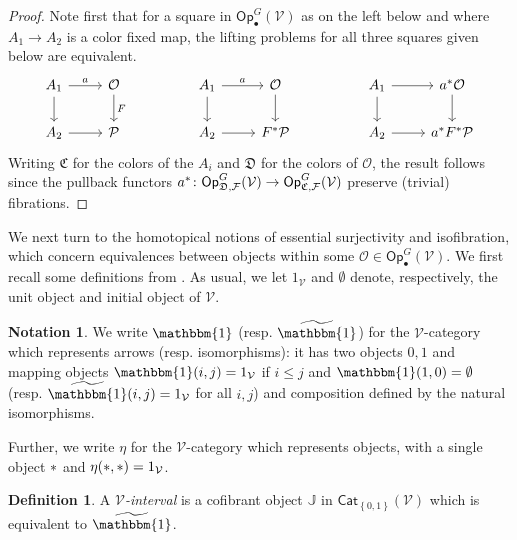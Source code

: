 \documentclass[a4paper,10pt
,draft
]{article}%
\numberwithin{equation}{section}
\numberwithin{figure}{section}
\theoremstyle{definition} %
\newtheorem{definition}[equation]{Definition}%
\newtheorem{notation}[equation]{Notation}%
\newcommand{\set}[1]{\left\{#1\right\}}%
\newcommand{\Cat}{\mathsf{Cat}}
\newcommand{\F}{\ensuremath{\mathcal F}}
\newcommand{\V}{\ensuremath{\mathcal V}}
\renewcommand{\O}{\ensuremath{\mathcal O}}
\renewcommand{\P}{\ensuremath{\mathcal P}}
\newcommand{\1}{\ensuremath{\mathbbm 1}}%
\begin{document}
\begin{proof}
Note first that for a square in $\mathsf{Op}^G_{\bullet}(\V)$
as on the left below
and where $A_1 \to A_2$ is a color fixed map, 
the lifting problems for all three squares given below are equivalent.
\begin{equation}%
\begin{tikzcd}
A_1 \arrow[d] \arrow[r, "a"]
&
\mathcal{O} \arrow[d, "F"]
&&
A_1 \arrow[d] \arrow[r, "a"]
&
\mathcal{O} \arrow[d]
&&
A_1 \arrow[d] \arrow[r]
&
a^{\**} \mathcal{O} \arrow[d]
\\
A_2 \arrow[r]
&
\P
&&
A_2 \arrow[r]
&
F^{\**} \P
&&
A_2 \arrow[r]
&
a^{\**} F^{\**} \P
\end{tikzcd}
\end{equation}
Writing $\mathfrak{C}$ for the colors of the $A_i$ and
$\mathfrak{D}$ for the colors of $\O$,
the result follows since the pullback functors
$a^{\**} \colon \mathsf{Op}^G_{\mathfrak{D},\F}(\V)
\to \mathsf{Op}^G_{\mathfrak{C},\F}(\V)$
preserve (trivial) fibrations.
\end{proof}




We next turn to the homotopical notions of essential surjectivity and isofibration, 
which concern equivalences between objects within some 
$\O \in \mathsf{Op}^G_\bullet(\V)$.
We first recall some definitions from \cite{BM13}.
As usual, we let $1_\V$ and $\emptyset$ denote, respectively, the unit object and initial object of $\V$.

\begin{notation}
      \label{1_NOT}
      We write $\mathbbm{1}$ (resp. $\widetilde{\mathbbm{1}}$)
      for the $\V$-category which represents arrows (resp. isomorphisms):
      it has two objects $0,1$
      and mapping objects
      $\mathbbm{1}(i,j)= 1_{\V}$
      if $i \leq j$
      and 
      $\mathbbm{1}(1,0)= \emptyset$
      (resp. $\widetilde{\mathbbm{1}}(i,j)= 1_{\V}$ for all $i,j$)
      and composition defined by the natural isomorphisms.

      Further, we write $\eta$ for the $\V$-category which represents objects,
      with a single object $\**$ and $\eta(\**,\**) = 1_\V$.
\end{notation}



\begin{definition}
      A {\em $\V$-interval} is a cofibrant object $\mathbb{J}$ in $\Cat_{\set{0,1}}(\V)$
      which is equivalent to $\widetilde{\mathbbm{1}}$.
\end{definition}
\end{document}
